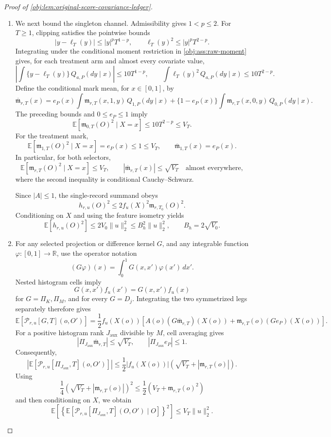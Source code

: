 \documentclass[11pt]{article}
\begin{document}
\begin{proof}[Proof of \cref{obj:lem:original-score-covariance-ledger}]
\begin{enumerate}
\item We next bound the singleton channel. Admissibility gives \(1<p\le2\). For \(T\ge1\), clipping satisfies the pointwise bounds
\[
|y-\ell_T(y)|\le |y|^pT^{1-p},
\qquad
\ell_T(y)^2\le |y|^pT^{2-p}.
\]
Integrating under the conditional moment restriction in \cref{obj:ass:raw-moment} gives, for each treatment arm and almost every covariate value,
\[
\left|
\int\{y-\ell_T(y)\}\,Q_{a,P}(dy\mid x)
\right|
\le10T^{1-p},
\qquad
\int\ell_T(y)^2\,Q_{a,P}(dy\mid x)
\le10T^{2-p}.
\]
Define the conditional mark mean, for \(x\in[0,1]\), by
\[
\overline{\mathfrak m}_{r,T}(x)
=
e_P(x)\int\mathfrak m_{r,T}(x,1,y)\,Q_{1,P}(dy\mid x)
+
\{1-e_P(x)\}
\int\mathfrak m_{r,T}(x,0,y)\,Q_{0,P}(dy\mid x).
\]
The preceding bounds and \(0\le e_P\le1\) imply
\[
\mathbb E[\mathfrak m_{0,T}(O)^2\mid X=x]
\le10T^{2-p}\le V_T.
\]
For the treatment mark,
\[
\mathbb E[\mathfrak m_{1,T}(O)^2\mid X=x]
=e_P(x)\le1\le V_T,
\qquad
\overline{\mathfrak m}_{1,T}(x)=e_P(x).
\]
In particular, for both selectors,
\[
\mathbb E[\mathfrak m_{r,T}(O)^2\mid X=x]\le V_T,
\qquad
|\overline{\mathfrak m}_{r,T}(x)|\le\sqrt{V_T}
\quad\text{almost everywhere},
\]
where the second inequality is conditional Cauchy--Schwarz.

Since \(|A|\le1\), the single-record summand obeys
\[
h_{r,u}(O)^2
\le
2f_u(X)^2\mathfrak m_{r,T_0}(O)^2.
\]
Conditioning on \(X\) and using the feature isometry yields
\[
\mathbb E[h_{r,u}(O)^2]
\le2V_0\|u\|_2^2
\le B_h^2\|u\|_2^2,
\qquad
B_h=2\sqrt{V_0}.
\]

\item For any selected projection or difference kernel \(G\), and any integrable function \(\varphi:[0,1]\to\mathbb R\), use the operator notation
\[
(G\varphi)(x)=\int_0^1G(x,x')\varphi(x')\,dx'.
\]
Nested histogram cells imply
\[
G(x,x')f_u(x')=G(x,x')f_u(x)
\]
for \(G=\Pi_K,\Pi_M\), and for every \(G=D_j\). Integrating the two symmetrized legs separately therefore gives
\[
\mathbb E[\mathscr P_{r,u}[G,T](o,O')]
=
\frac12f_u(X(o))
\left[
A(o)(G\overline{\mathfrak m}_{r,T})(X(o))
+
\mathfrak m_{r,T}(o)(Ge_P)(X(o))
\right].
\]
For a positive histogram rank \(J_{\mathrm{aux}}\) divisible by \(M\), cell averaging gives
\[
|\Pi_{J_{\mathrm{aux}}}\overline{\mathfrak m}_{r,T}|
\le\sqrt{V_T},
\qquad
|\Pi_{J_{\mathrm{aux}}}e_P|\le1.
\]
Consequently,
\[
\left|
\mathbb E[\mathscr P_{r,u}[\Pi_{J_{\mathrm{aux}}},T](o,O')]
\right|
\le
\frac12|f_u(X(o))|
\left(\sqrt{V_T}+|\mathfrak m_{r,T}(o)|\right).
\]
Using
\[
\frac14\left(\sqrt{V_T}+|\mathfrak m_{r,T}(o)|\right)^2
\le
\frac12\left(V_T+\mathfrak m_{r,T}(o)^2\right)
\]
and then conditioning on \(X\), we obtain
\[
\mathbb E\!\left[
\left\{
\mathbb E[\mathscr P_{r,u}[\Pi_{J_{\mathrm{aux}}},T](O,O')\mid O]
\right\}^{\!2}
\right]
\le V_T\|u\|_2^2.
\]


\end{enumerate}
\end{proof}
\end{document}
